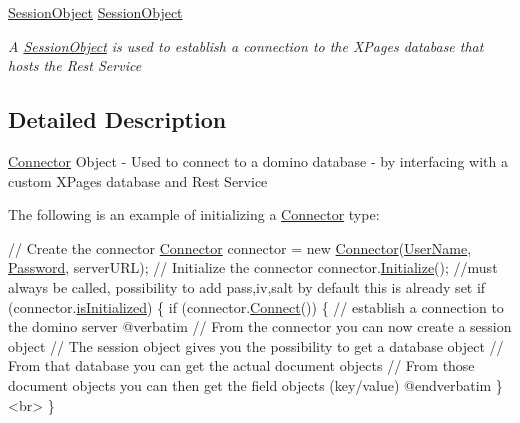 \begin{DoxyCompactItemize}
\mbox{\hyperlink{class_session_object}{Session\+Object}} \mbox{\hyperlink{class_connector_a0a7bb42f9530796c086ab50785147ce9}{Session\+Object}}
\begin{DoxyCompactList}\small\item\em A \mbox{\hyperlink{class_session_object}{Session\+Object}} is used to establish a connection to the X\+Pages database that hosts the Rest Service \end{DoxyCompactList}\end{DoxyCompactItemize}


\subsection{Detailed Description}
\mbox{\hyperlink{class_connector}{Connector}} Object -\/ Used to connect to a domino database -\/ by interfacing with a custom X\+Pages database and Rest Service 

The following is an example of initializing a {\ttfamily \mbox{\hyperlink{class_connector}{Connector}}} type\+: 
\begin{DoxyCode}
    \textcolor{comment}{// Create the connector}
    \mbox{\hyperlink{class_connector}{Connector}} connector = \textcolor{keyword}{new} \mbox{\hyperlink{class_connector_a259c6d94252479cc3028038ebbaa7dc8}{Connector}}(\mbox{\hyperlink{class_connector_a41d247f09774f0ed206ce1a4a2463fed}{UserName}}, 
      \mbox{\hyperlink{class_connector_a7dd469898462ef761d256392766461fe}{Password}}, serverURL);
    \textcolor{comment}{// Initialize the connector}
    connector.\mbox{\hyperlink{class_connector_a376c1ed70efd33d0bb18bb36e5cf076e}{Initialize}}();
    \textcolor{comment}{//must always be called, possibility to add pass,iv,salt by default this is already set}
    \textcolor{keywordflow}{if} (connector.\mbox{\hyperlink{class_connector_a017d40b1f4cf2cbaa5d4b755cf09269e}{isInitialized}}) \{
        \textcolor{keywordflow}{if} (connector.\mbox{\hyperlink{class_connector_a0dcf8f969c37c4306c567417a872329a}{Connect}}()) \{  \textcolor{comment}{// establish a connection to the domino server}
@verbatim
\textcolor{comment}{// From the connector you can now create a session object}
\textcolor{comment}{// The session object gives you the possibility to get a database object}
\textcolor{comment}{// From that database you can get the actual document objects}
\textcolor{comment}{// From those document objects you can then get the field objects (key/value)}
\textcolor{keyword}{@end}verbatim
        \}   
<br>    \}
\end{DoxyCode}
 


